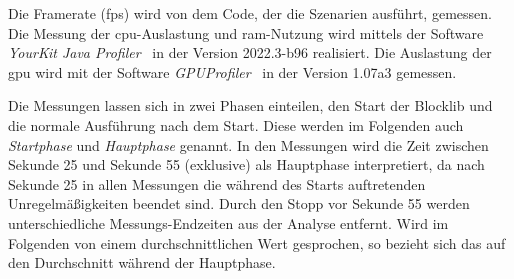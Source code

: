 Die Framerate (\ac{fps}) wird von dem Code, der die Szenarien ausführt, gemessen. Die Messung der \ac{cpu}-Auslastung und \ac{ram}-Nutzung wird mittels der Software \emph{YourKit Java Profiler}~\cite{YourKitGmbH} in der Version 2022.3-b96 realisiert. Die Auslastung der \ac{gpu} wird mit der Software \emph{GPUProfiler}~\cite{Main2021} in der Version 1.07a3 gemessen. 

Die Messungen lassen sich in zwei Phasen einteilen, den Start der Blocklib und die normale Ausführung nach dem Start. Diese werden im Folgenden auch \emph{Startphase} und \emph{Hauptphase} genannt. In den Messungen wird die Zeit zwischen Sekunde 25 und Sekunde 55 (exklusive) als Hauptphase interpretiert, da nach Sekunde 25 in allen Messungen die während des Starts auftretenden Unregelmäßigkeiten beendet sind. Durch den Stopp vor Sekunde 55 werden unterschiedliche Messungs-Endzeiten aus der Analyse entfernt. Wird im Folgenden von einem durchschnittlichen Wert gesprochen, so bezieht sich das auf den Durchschnitt während der Hauptphase.